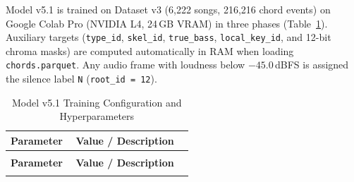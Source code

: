 \documentclass[a4paper]{article}
\begin{document}
Model v5.1 is trained on Dataset v3 (6,222 songs, 216,216 chord events) on Google Colab Pro (NVIDIA L4, 24\,GB VRAM) in three phases (Table~\ref{tab:training_config}). Auxiliary targets (\texttt{type\_id}, \texttt{skel\_id}, \texttt{true\_bass}, \texttt{local\_key\_id}, and 12-bit chroma masks) are computed automatically in RAM when loading \texttt{chords.parquet}. Any audio frame with loudness below $-45.0$\,dBFS is assigned the silence label \texttt{N} (\texttt{root\_id = 12}).

\begin{longtable}{@{}
    >{\raggedright\arraybackslash}p{0.34\linewidth}
    >{\raggedright\arraybackslash}p{0.61\linewidth}@{}}

    \caption{Model v5.1 Training Configuration and Hyperparameters}\label{tab:training_config} \\
    \toprule
    \textbf{Parameter} & \textbf{Value / Description} \\
    \midrule
    \endfirsthead
    \multicolumn{2}{l}{\footnotesize\itshape (Table~\ref{tab:training_config} continued)}\\
    \toprule
    \textbf{Parameter} & \textbf{Value / Description} \\
    \midrule
    \endhead
    \bottomrule
    \endlastfoot


\end{longtable}
\end{document}
